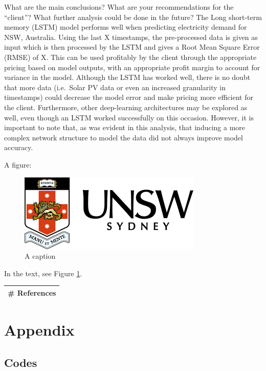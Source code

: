 \documentclass[mstat,12pt]{unswthesis}
\begin{document}
What are the main conclusions? What are your recommendations for the
``client''? What further analysis could be done in the future? The Long
short-term memory (LSTM) model performs well when predicting electricity
demand for NSW, Australia. Using the last X timestamps, the
pre-processed data is given as input which is then processed by the LSTM
and gives a Root Mean Square Error (RMSE) of X. This can be used
profitably by the client through the appropriate pricing based on model
outputs, with an appropriate profit margin to account for variance in
the model. Although the LSTM has worked well, there is no doubt that
more data (i.e.~Solar PV data or even an increased granularity in
timestamps) could decrease the model error and make pricing more
efficient for the client. Furthermore, other deep-learning architectures
may be explored as well, even though an LSTM worked successfully on this
occasion. However, it is important to note that, as was evident in this
analysis, that inducing a more complex network structure to model the
data did not always improve model accuracy.

A figure:

\begin{figure}[H]
\includegraphics{unsw-logo.png}
\caption{A caption}\label{myfigure}
\end{figure}

In the text, see Figure \ref{myfigure}.

\begin{longtable}[]{@{}l@{}}
\toprule
\endhead
\# References \\
\bottomrule
\end{longtable}




\hypertarget{appendix}{%
\chapter*{Appendix}\label{appendix}}

\hypertarget{codes}{%
\section*{\texorpdfstring{\textbf{Codes}}{Codes}}\label{codes}}
\end{document}
